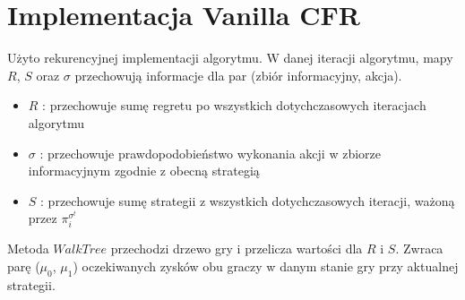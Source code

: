 \documentclass[licencjacka]{pracamgr}
\begin{document}
\section{Implementacja Vanilla CFR}

Użyto rekurencyjnej implementacji algorytmu. W danej iteracji algorytmu, mapy $R$, $S$ oraz $\sigma$ przechowują informacje
dla par (zbiór informacyjny, akcja).
\begin{itemize}
\item $R$ : przechowuje sumę regretu po wszystkich dotychczasowych iteracjach algorytmu
\item $\sigma$ : przechowuje prawdopodobieństwo wykonania akcji w zbiorze informacyjnym zgodnie z obecną strategią
\item $S$ : przechowuje sumę strategii z wszystkich dotychczasowych iteracji, ważoną przez $\pi_i^{\sigma^t}$
\end{itemize}

\noindent
Metoda $WalkTree$ przechodzi drzewo gry i przelicza wartości dla $R$ i $S$. Zwraca parę
($\mu_0$, $\mu_1$) oczekiwanych zysków obu graczy w danym stanie gry przy aktualnej strategii. \\\\

\end{document}
